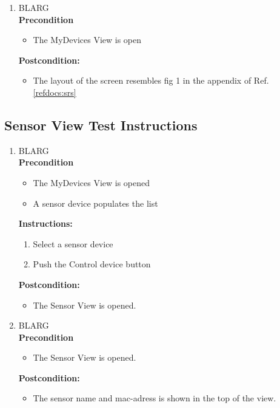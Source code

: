 \documentclass[a4paper]{article}
\newlength{\testlabellength}
\newenvironment{testlist}{\begin{enumerate}[label=\bfseries Instruction \thesubsection.\arabic* , labelindent=0pt, labelwidth=\testlabellength , leftmargin=2cm]}{\end{enumerate}}
\newenvironment{precondition}{
{\color{white}BLARG}\\ 
\textbf{Precondition}
\begin{itemize}[labelindent=0cm, labelwidth=2cm , leftmargin=1cm]
}
{\end{itemize}}
\newenvironment{instruction}{
\textbf{Instructions:}
\begin{enumerate}[label=\bfseries  \arabic*., labelindent=0cm, labelwidth=2cm , leftmargin=1cm]
}
{\end{enumerate}}
\newenvironment{postcondition}{
\textbf{Postcondition:}
\begin{itemize}[labelindent=0cm, labelwidth=2cm , leftmargin=1cm]
}
{\end{itemize}}
\begin{document}
\begin{appendices}
\begin{testlist}
    
    \item
		\begin{precondition}
			\item The MyDevices View is open
		\end{precondition}
		\begin{postcondition}
			\item The layout of the screen resembles fig 1 in the appendix of Ref. \ref{refdocs:srs}
		\end{postcondition}
		   
\end{testlist}

\subsection{Sensor View Test Instructions}
\begin{testlist}
	\item
 		\begin{precondition}
 			\item The MyDevices View is opened
 			\item A sensor device populates the list
 		\end{precondition}
 		\begin{instruction}
 			\item Select a sensor device
 			\item Push the Control device button
 		\end{instruction}
 		\begin{postcondition}
 			\item The Sensor View is opened. 
 		\end{postcondition}


	\item
		\begin{precondition}
			\item The Sensor View is opened.
		\end{precondition}
		\begin{postcondition}
			\item The sensor name and mac-adress is shown in the top of the view.
		\end{postcondition}


\end{testlist}
\end{appendices}
\end{document}
